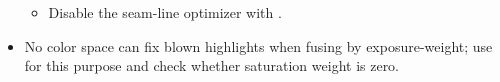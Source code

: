 \begin{itemize}
\begin{itemize}
    \item
      Disable the seam-line optimizer with .
    \end{itemize}
\fi

\ifenfuse
  \item
     No color space can fix blown highlights when
    fusing by exposure-weight; use
     for this purpose and check
    whether saturation weight is zero.  \fi
\end{itemize}



